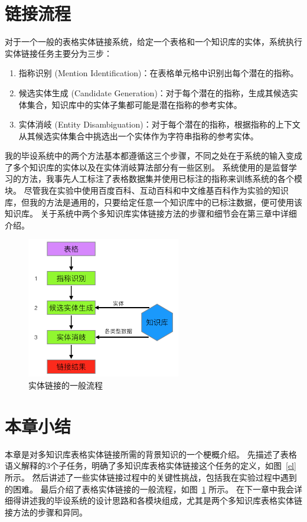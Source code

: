 \section{链接流程}

对于一个一般的表格实体链接系统，给定一个表格和一个知识库的实体，系统执行实体链接任务主要分为三步：

\begin{enumerate}[1.]
\item 指称识别 (Mention Identification)：在表格单元格中识别出每个潜在的指称。
\item 候选实体生成 (Candidate Generation)：对于每个潜在的指称，生成其候选实体集合，知识库中的实体子集都可能是潜在指称的参考实体。
\item 实体消岐 (Entity Disambiguation)：对于每个潜在的指称，根据指称的上下文从其候选实体集合中挑选出一个实体作为字符串指称的参考实体。
\end{enumerate}

我的毕设系统中的两个方法基本都遵循这三个步骤，不同之处在于系统的输入变成了多个知识库的实体以及在实体消岐算法部分有一些区别。
系统使用的是监督学习的方法，我事先人工标注了表格数据集并使用已标注的指称来训练系统的各个模块。
尽管我在实验中使用百度百科、互动百科和中文维基百科作为实验的知识库，但我的方法是通用的，只要给定任意一个知识库中的已标注数据，便可使用该知识库。
关于系统中两个多知识库实体链接方法的步骤和细节会在第三章中详细介绍。

\begin{figure}[htbp]
\centering
\includegraphics[width=0.6\textwidth]{img/flow}
\caption{实体链接的一般流程}
\label{flow}
\end{figure}


\section{本章小结}
本章是对多知识库表格实体链接所需的背景知识的一个梗概介绍。
先描述了表格语义解释的3个子任务，明确了多知识库表格实体链接这个任务的定义，如图~\ref{el} 所示。
然后讲述了一些实体链接过程中的关键性挑战，包括我在实验过程中遇到的困难。
最后介绍了表格实体链接的一般流程，如图~\ref{flow} 所示。
在下一章中我会详细得讲述我的毕设系统的设计思路和各模块组成，尤其是两个多知识库表格实体链接方法的步骤和异同。





